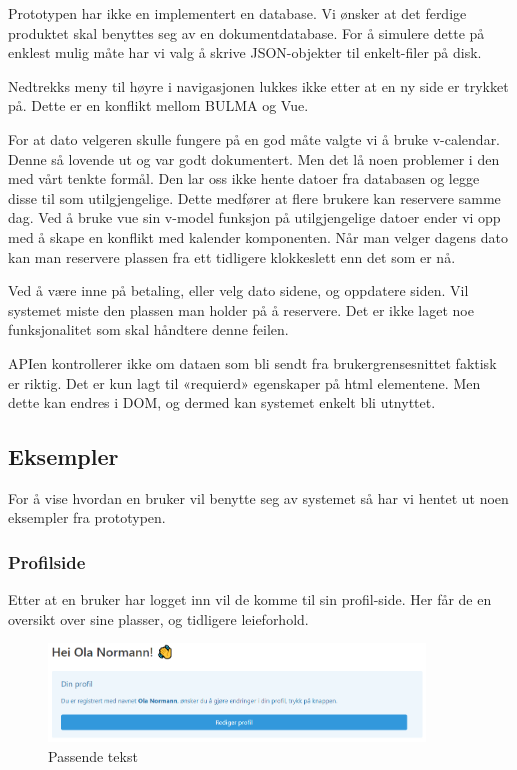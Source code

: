 Prototypen har ikke en implementert en database. Vi ønsker at det ferdige produktet skal benyttes seg av en dokumentdatabase. For å simulere dette på enklest mulig måte har vi valg å skrive JSON-objekter til enkelt-filer på disk.


Nedtrekks meny til høyre i navigasjonen lukkes ikke etter at en ny side er trykket på. Dette er en konflikt mellom BULMA og Vue.

For at dato velgeren skulle fungere på en god måte valgte vi å bruke v-calendar. Denne så lovende ut og var godt dokumentert. Men det lå noen problemer i den med vårt tenkte formål. Den lar oss ikke hente datoer fra databasen og legge disse til som utilgjengelige. Dette medfører at flere brukere kan reservere samme dag. Ved å bruke vue sin v-model funksjon på utilgjengelige datoer ender vi opp med å skape en konflikt med kalender komponenten.
Når man velger dagens dato kan man reservere plassen fra ett tidligere klokkeslett enn det som er nå.

Ved å være inne på betaling, eller velg dato sidene, og oppdatere siden. Vil systemet miste den plassen man holder på å reservere. Det er ikke laget noe funksjonalitet som skal håndtere denne feilen.

APIen kontrollerer ikke om dataen som bli sendt fra brukergrensesnittet faktisk er riktig. Det er kun lagt til «requierd» egenskaper på html elementene. Men dette kan endres i DOM, og dermed kan systemet enkelt bli utnyttet.


\subsection{Eksempler}
For å vise hvordan en bruker vil benytte seg av systemet så har vi hentet ut noen eksempler fra prototypen.

\subsubsection{Profilside}
Etter at en bruker har logget inn vil de komme til sin profil-side. Her får de en oversikt over sine plasser, og tidligere leieforhold.

\begin{figure}[H]
    \centering
    \includegraphics[width=10cm]{bilder/Eksempler/profile_start.png}
    \caption{Passende tekst}
    \label{fig:eks:profile}
\end{figure}

